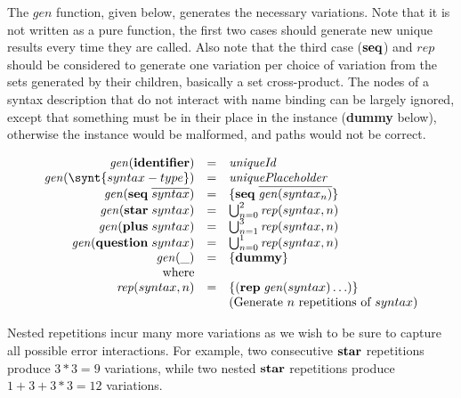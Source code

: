 \documentclass{kththesis}
\begin{document}
\newcommand{\gen}{\mathit{gen}}
\newcommand{\genrep}{\mathit{rep}}


The $\gen$ function, given below, generates the necessary variations. Note that it is not written as a pure function, the first two cases should generate new unique results every time they are called. Also note that the third case ($\mathrel{\mathbf{seq}}$) and $\genrep$ should be considered to generate one variation per choice of variation from the sets generated by their children, basically a set cross-product. The nodes of a syntax description that do not interact with name binding can be largely ignored, except that something must be in their place in the instance (\textbf{dummy} below), otherwise the instance would be malformed, and paths would not be correct.


$$
\begin{array}{rcl}
\gen(\ident) & = & \mathit{uniqueId} \\
\gen(\synt{syntax-type}) & = & \mathit{uniquePlaceholder} \\
\gen(\seq \overline{syntax}) & = & \{\seq \overline{\gen(syntax_n)}\} \\
\gen(\repstar syntax) & = & \bigcup_{n=0}^2 \genrep(syntax, n) \\
\gen(\repplus syntax) & = & \bigcup_{n=1}^3 \genrep(syntax, n) \\
\gen(\repquestion syntax) & = & \bigcup_{n=0}^1 \genrep(syntax, n) \\
\gen(\_) & = & \{\textbf{dummy}\} \\
\text{where} & & \\
\genrep(syntax, n) & = & \{(\repseq \gen(syntax)\ldots)\} \\
& & \text{(Generate $n$ repetitions of $syntax$)} \\
\end{array}
$$

Nested repetitions incur many more variations as we wish to be sure to capture all possible error interactions. For example, two consecutive $\mathrel{\mathbf{star}}$ repetitions produce $3 * 3 = 9$ variations, while two nested $\mathrel{\mathbf{star}}$ repetitions produce $1 + 3 + 3*3 = 12$ variations.

\end{document}
